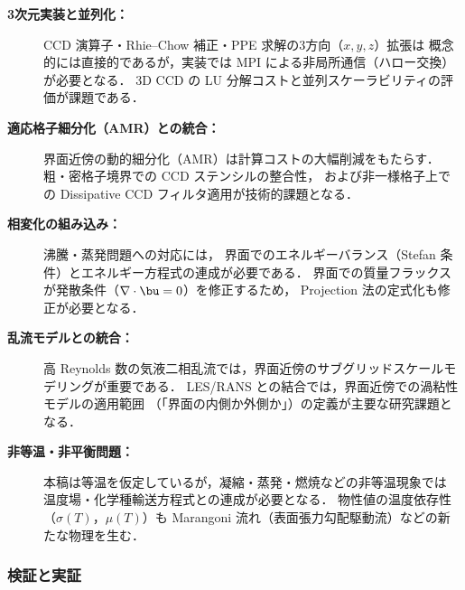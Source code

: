 \begin{description}
  \item[\textbf{3次元実装と並列化：}]
        CCD 演算子・Rhie--Chow 補正・PPE 求解の3方向（$x,y,z$）拡張は
        概念的には直接的であるが，実装では MPI による非局所通信（ハロー交換）が必要となる．
        3D CCD の LU 分解コストと並列スケーラビリティの評価が課題である．

  \item[\textbf{適応格子細分化（AMR）との統合：}]
        界面近傍の動的細分化（AMR）は計算コストの大幅削減をもたらす．
        粗・密格子境界での CCD ステンシルの整合性，
        および非一様格子上での Dissipative CCD フィルタ適用が技術的課題となる．

  \item[\textbf{相変化の組み込み：}]
        沸騰・蒸発問題への対応には，
        界面でのエネルギーバランス（Stefan 条件）とエネルギー方程式の連成が必要である．
        界面での質量フラックスが発散条件（$\nabla\cdot\bu = 0$）を修正するため，
        Projection 法の定式化も修正が必要となる．

  \item[\textbf{乱流モデルとの統合：}]
        高 Reynolds 数の気液二相乱流では，界面近傍のサブグリッドスケールモデリングが重要である．
        LES/RANS との結合では，界面近傍での渦粘性モデルの適用範囲
        （「界面の内側か外側か」）の定義が主要な研究課題となる．

  \item[\textbf{非等温・非平衡問題：}]
        本稿は等温を仮定しているが，凝縮・蒸発・燃焼などの非等温現象では
        温度場・化学種輸送方程式との連成が必要となる．
        物性値の温度依存性（$\sigma(T)$，$\mu(T)$）も
        Marangoni 流れ（表面張力勾配駆動流）などの新たな物理を生む．
\end{description}

\subsubsection{検証と実証}

